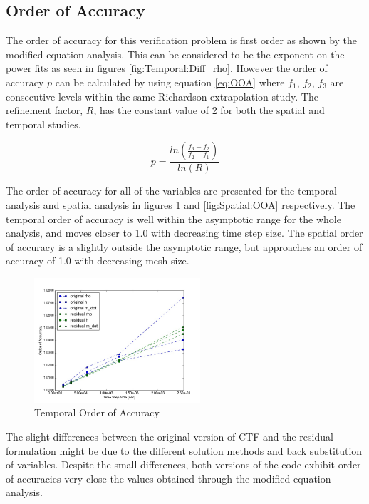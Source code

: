 \documentclass{mc2015}
\begin{document}
\subsection{Order of Accuracy}

The order of accuracy for this verification problem is first order as shown by
the modified equation analysis. This can be considered to be the exponent on
the power fits as seen in figures \ref{fig:Temporal:Diff_rho}. However the order
of accuracy $p$ can be calculated by using equation \ref{eq:OOA} where $f_{1}$,
$f_{2}$, $f_{3}$ are consecutive levels within the same Richardson extrapolation
study. The refinement factor, $R$, has the constant value of 2 for both the
spatial and temporal studies.

\begin{equation}
	\label{eq:OOA}
	p= \frac{
	      	ln \left(
	      	\frac{f_{3}-f_{2}}{f_{2}-f_{1}}
	      	\right)
	    }{ln(R)}
\end{equation}

The order of accuracy for all of the variables are presented for the temporal
analysis and spatial analysis in figures \ref{fig:Temporal:OOA} and
\ref{fig:Spatial:OOA} respectively. The temporal order of accuracy is well
within the asymptotic range for the whole analysis, and moves closer to 1.0 with
decreasing time step size. The spatial order of accuracy is a slightly outside
the asymptotic range, but approaches an order of accuracy of 1.0 with
decreasing mesh size. 

\begin{figure}[!h]
	\centering
	\includegraphics[width=0.55\textwidth]{images/Temporal_Study/Order_Of_Accuracy_Summary}
	\caption{Temporal Order of Accuracy}
	\label{fig:Temporal:OOA}
\end{figure}

The slight differences between the original version of CTF and the residual
formulation might be due to the different solution methods and back substitution
of variables. Despite the small differences, both versions of the code exhibit
order of accuracies very close the values obtained through the modified
equation analysis.
\end{document}
